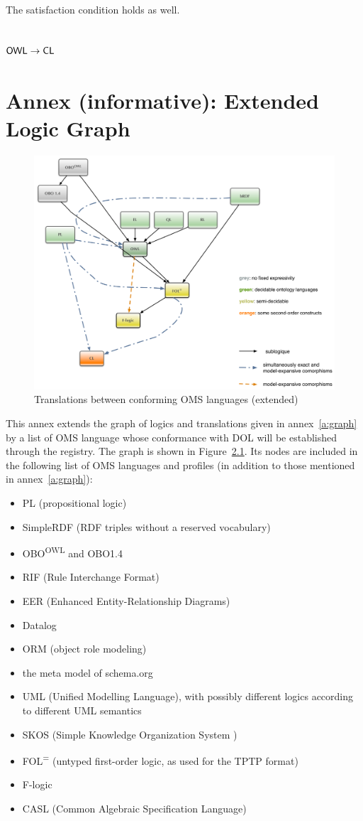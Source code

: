 \documentclass[10pt,%
\ifpretendfinal
final%
\else
draft%
\fi,
]{scrreprt}
\newcommand*{\CL}{\ensuremath{\mathsf{CL}}\xspace}
\newcommand{\annexrefname}{annex}
\newcommand{\figurerefname}{Figure}
\newcommand{\aref}[1]{\annexrefname~\ref{#1}}
\newcommand{\fref}[1]{\figurerefname~\ref{#1}}
\newcommand{\sclause}[1]{\section{#1}}
\newcommand{\infannex}[1]{ \chapter{Annex (informative): #1} }
\begin{document}
	The satisfaction condition holds as well.

\sclause{$\OWL \rightarrow \CL$}


\infannex{Extended Logic Graph}\label{a:ext-graph}

\begin{figure}
  \centering
  \includegraphics[width=\textwidth]{illustrations/pre-reduced-ontograph}
  \caption{Translations between conforming OMS languages (extended)}
  \label{fig:pre-ontograph}
\end{figure}
This annex extends the graph of logics and translations given in
\aref{a:graph} by a list of OMS language whose conformance with
DOL will be established through the registry.  The graph is shown in
\fref{fig:pre-ontograph}.  Its nodes are included in the following
list of OMS languages and profiles (in addition to those
mentioned in \aref{a:graph}):
\begin{itemize}
\item PL (propositional logic)
\item SimpleRDF (RDF triples without a reserved vocabulary)
\item OBO\textsuperscript{OWL} and OBO1.4
\item RIF (Rule Interchange Format)
\item EER (Enhanced Entity-Relationship Diagrams) %
\item Datalog
\item ORM (object role modeling)
\item the meta model of schema.org
\item UML (Unified Modelling Language), with possibly different logics according to different
UML semantics
\item SKOS (Simple Knowledge Organization System )
\item FOL\textsuperscript{=} (untyped first-order logic, as used for the
TPTP format)
\item F-logic
\item CASL (Common Algebraic Specification Language)
\end{itemize}
\end{document}
